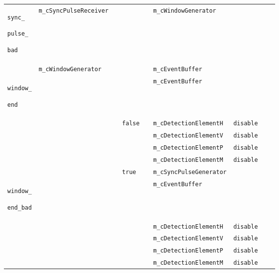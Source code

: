 \begin{footnotesize}
\begin{longtable}[H]{ | m{1.2cm} | m{1.9cm} | m{1.2cm} | l | m{1.5cm} || m{1.8cm} | m{1.4cm} | m{1.2cm} | m{1.7cm} | }
\hline

  \texttt{sync\_} \par \texttt{pulse\_} \par \texttt{bad} &
  \texttt{m\_cSyncPulseReceiver} &
  &
  &
  &
  \texttt{m\_cWindowGenerator} &
  &
  &
  \\
\cline{2-9}
  &
  \texttt{m\_cWindowGenerator} &
  &
  &
  &
  \texttt{m\_cEventBuffer} &
  &
  &
  \\
  
\hline

  \texttt{window\_} \par \texttt{end} &
  &
  &
  &
  &
  \texttt{m\_cEventBuffer} &
  &
  &
  \\
\cline{4-9}
  &
  &
  &
  \texttt{false} &
  &
  \texttt{m\_cDetectionElementH} &
  \texttt{disable} &
  &
  \\
\cline{6-9}
  &
  &
  &
  &
  &
  \texttt{m\_cDetectionElementV} &
  \texttt{disable} &
  &
  \\
\cline{6-9}
  &
  &
  &
  &
  &
  \texttt{m\_cDetectionElementP} &
  \texttt{disable} &
  &
  \\
\cline{6-9}
  &
  &
  &
  &
  &
  \texttt{m\_cDetectionElementM} &
  \texttt{disable} &
  &
  \\
\cline{4-9}
  &
  &
  &
  \texttt{true} &
  &
  \texttt{m\_cSyncPulseGenerator} &
  &
  &
  \\
  
\hline

  \texttt{window\_} \par \texttt{end\_bad} &
  &
  &
  &
  &
  \texttt{m\_cEventBuffer} &
  &
  &
  \\
\cline{6-9}
  &
  &
  &
  &
  &
  \texttt{m\_cDetectionElementH} &
  \texttt{disable} &
  &
  \\
\cline{6-9}
  &
  &
  &
  &
  &
  \texttt{m\_cDetectionElementV} &
  \texttt{disable} &
  &
  \\
\cline{6-9}
  &
  &
  &
  &
  &
  \texttt{m\_cDetectionElementP} &
  \texttt{disable} &
  &
  \\
\cline{6-9}
  &
  &
  &
  &
  &
  \texttt{m\_cDetectionElementM} &
  \texttt{disable} &
  &
  \\
  
\hline


\end{longtable}
\end{footnotesize}
